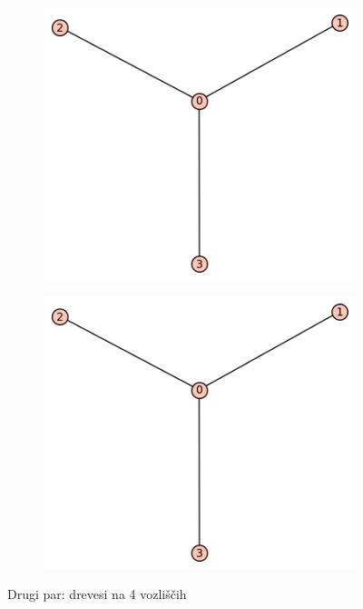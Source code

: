 \documentclass[12pt, a4paper]{article}
\begin{document}
\begin{center}
\begin{center}
\begin{figure}[!htb]
\centering
\begin{subfigure}{0.5\textwidth}
  \centering
  \includegraphics[width=0.4\linewidth]{t-4}
\end{subfigure}%
\begin{subfigure}{0.5\textwidth}
  \centering
  \includegraphics[width=0.5\linewidth]{t-4}
\end{subfigure}
\caption{Drugi par: drevesi na 4 vozliščih}
\label{fig:test}
\end{figure}
\end{center}


\end{center}
\end{document}
